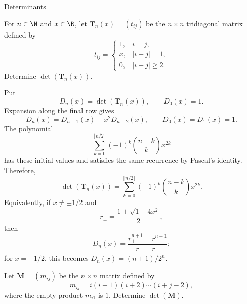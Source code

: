 \begin{expectedproblemgroup}{Determinants}
        \begin{expectedsubproblem}
            For $n\in\N$ and $x\in\R$, let
            $\mathbf{T}_n(x)=(t_{ij})$ be the $n\times n$ tridiagonal matrix
            defined by
            \[
                t_{ij}
                =
                \begin{cases}
                    1, & i=j,\\
                    x, & |i-j|=1,\\
                    0, & |i-j|\geq2.
                \end{cases}
            \]
            Determine $\det(\mathbf{T}_n(x))$.
        \end{expectedsubproblem}

        \begin{expectedsubsolution}
            Put
            \[
                D_n(x)=\det(\mathbf{T}_n(x)),
                \qquad
                D_0(x)=1.
            \]
            Expansion along the final row gives
            \[
                D_n(x)=D_{n-1}(x)-x^2D_{n-2}(x),
                \qquad
                D_0(x)=D_1(x)=1.
            \]
            The polynomial
            \[
                \sum_{k=0}^{\lfloor n/2\rfloor}
                (-1)^k\binom{n-k}{k}x^{2k}
            \]
            has these initial values and satisfies the same recurrence by
            Pascal's identity. Therefore,
            \[
                \boxed{
                    \det(\mathbf{T}_n(x))
                    =
                    \sum_{k=0}^{\lfloor n/2\rfloor}
                    (-1)^k\binom{n-k}{k}x^{2k}
                }.
            \]
            Equivalently, if $x\neq\pm1/2$ and
            \[
                r_{\pm}=\frac{1\pm\sqrt{1-4x^2}}{2},
            \]
            then
            \[
                D_n(x)=\frac{r_+^{n+1}-r_-^{n+1}}{r_+-r_-};
            \]
            for $x=\pm1/2$, this becomes $D_n(x)=(n+1)/2^n$.
        \end{expectedsubsolution}

        \begin{expectedsubproblem}
            Let $\mathbf{M}=(m_{ij})$ be the $n\times n$ matrix defined by
            \[
                m_{ij}=i(i+1)(i+2)\cdots(i+j-2),
            \]
            where the empty product $m_{i1}$ is $1$. Determine
            $\det(\mathbf{M})$.
        \end{expectedsubproblem}


\end{expectedproblemgroup}
